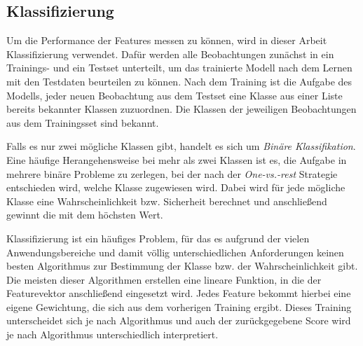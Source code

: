 \subsection{Klassifizierung}
Um die Performance der Features messen zu können, wird in dieser Arbeit Klassifizierung verwendet. Dafür werden alle Beobachtungen zunächst in ein Trainings- und ein Testset unterteilt, um das trainierte Modell nach dem Lernen mit den Testdaten beurteilen zu können. Nach dem Training ist die Aufgabe des Modells, jeder neuen Beobachtung aus dem Testset eine Klasse aus einer Liste bereits bekannter Klassen zuzuordnen. Die Klassen der jeweiligen Beobachtungen aus dem Trainingsset sind bekannt.

Falls es nur zwei mögliche Klassen gibt, handelt es sich um \emph{Binäre Klassifikation}. Eine häufige Herangehensweise bei mehr als zwei Klassen ist es, die Aufgabe in mehrere binäre Probleme zu zerlegen, bei der nach der \emph{One-vs.-rest} Strategie entschieden wird, welche Klasse zugewiesen wird. Dabei wird für jede mögliche Klasse eine Wahrscheinlichkeit bzw. Sicherheit berechnet und anschließend gewinnt die mit dem höchsten Wert.

Klassifizierung ist ein häufiges Problem, für das es aufgrund der vielen Anwendungsbereiche und damit völlig unterschiedlichen Anforderungen keinen besten Algorithmus zur Bestimmung der Klasse bzw. der Wahrscheinlichkeit gibt. Die meisten dieser Algorithmen erstellen eine lineare Funktion, in die der Featurevektor anschließend eingesetzt wird. Jedes Feature bekommt hierbei eine eigene Gewichtung, die sich aus dem vorherigen Training ergibt. Dieses Training unterscheidet sich je nach Algorithmus und auch der zurückgegebene Score wird je nach Algorithmus unterschiedlich interpretiert.

